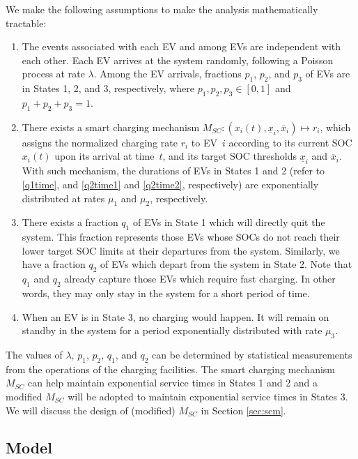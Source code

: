 \documentclass[journal]{IEEEtran}
\begin{document}
We make the following assumptions to make the analysis mathematically tractable:
\begin{enumerate}
\item The events associated with each EV and among EVs are independent with
      each other.  Each EV arrives at the system randomly, following a
      Poisson process at rate $\lambda$.  Among the EV arrivals, fractions $p_1$, $p_2$,
      and $p_3$ of EVs are in States 1, 2, and 3, respectively, where
      $p_1, p_2, p_3 \in [0, 1]$ and $p_1 + p_2 + p_3 = 1$.

\item There exists a smart charging mechanism
      $M_{SC}:(x_i(t), \underline{x}_i, \overline{x}_i) \mapsto r_i$, which
      assigns the normalized charging rate $r_i$ to EV~$i$ according to its
      current SOC $x_i(t)$ upon its arrival at time~$t$, and its target SOC 
      thresholds $\underline{x}_i$ and $\overline{x}_i$.  With such mechanism, the durations of EVs
      in States 1 and 2 (refer to \eqref{q1time}, and \eqref{q2time1} and
      \eqref{q2time2}, respectively) are exponentially distributed at rates
      $\mu_1$ and $\mu_2$, respectively.

\item There exists a fraction $q_1$ of EVs in State 1 which will directly quit
      the system.  This fraction represents those EVs whose SOCs do not reach
      their lower target SOC limits at their departures from the system.
      Similarly, we have a fraction $q_2$ of EVs which depart from the system in
      State 2.  Note that $q_1$ and $q_2$ already capture those EVs which
      require fast charging.  In other words, they may only stay in the system
      for a short period of time.

\item When an EV is in State 3, no charging would happen. It will remain on
      standby in the system for a period  exponentially distributed with
      rate $\mu_3$.
\end{enumerate}
  
The values of $\lambda$, $p_1$, $p_2$, $q_1$, and $q_2$ can be
determined by statistical measurements from the operations of the charging
facilities.  The smart charging mechanism $M_{SC}$ can help maintain exponential service times in States 1 and 2 and a modified $M_{SC}$ will be adopted to maintain exponential service times in States 3. We will discuss the design of (modified) $M_{SC}$ in Section \ref{sec:scm}.

\subsection{Model} \label{subsec:model}
\end{document}
